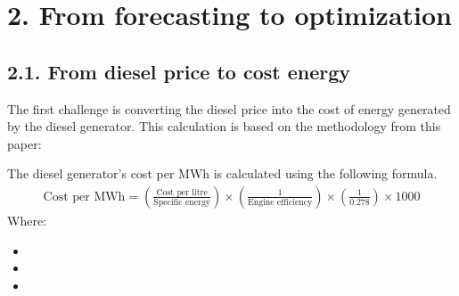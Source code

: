 \documentclass[letterpaper,10pt,english]{sphinxmanual}
\begin{document}
\section{2. From forecasting to optimization}
\label{\detokenize{index:from-forecasting-to-optimization}}

\subsection{2.1. From diesel price to cost energy}
\label{\detokenize{index:from-diesel-price-to-cost-energy}}
\sphinxAtStartPar
The first challenge is converting the diesel price into the cost of energy generated by the diesel generator. This calculation is based on the methodology from this paper: 

\sphinxAtStartPar
The diesel generator’s cost per MWh is calculated using the following formula.
\begin{equation*}
\begin{split}\text{Cost per MWh} = \left( \frac{\text{Cost per litre}}{\text{Specific energy}} \right) \times \left( \frac{1}{\text{Engine efficiency}} \right) \times \left( \frac{1}{0.278} \right) \times 1000\end{split}
\end{equation*}
\sphinxAtStartPar
Where:
\begin{itemize}
\item {} 
\sphinxAtStartPar
{}

\item {} 
\sphinxAtStartPar
{}

\item {} 
\sphinxAtStartPar
{}

\end{itemize}
\end{document}
